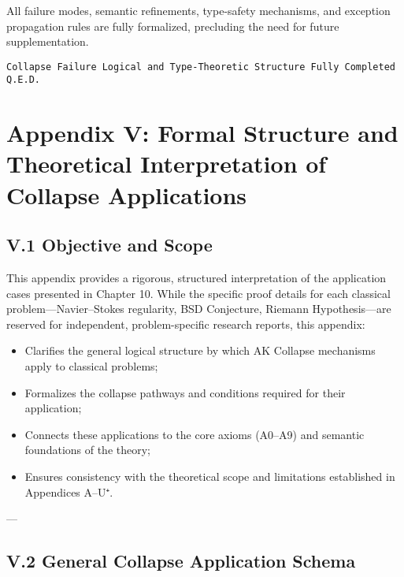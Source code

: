\documentclass[11pt]{article}
\begin{document}
All failure modes, semantic refinements, type-safety mechanisms, and exception propagation rules are fully formalized, precluding the need for future supplementation.

\begin{flushright}
\texttt{Collapse Failure Logical and Type-Theoretic Structure \quad Fully Completed \quad Q.E.D.}
\end{flushright}




\section*{Appendix V: Formal Structure and Theoretical Interpretation of Collapse Applications}

\subsection*{V.1 Objective and Scope}

This appendix provides a rigorous, structured interpretation of the application cases presented in Chapter 10.  
While the specific proof details for each classical problem—Navier–Stokes regularity, BSD Conjecture, Riemann Hypothesis—are reserved for independent, problem-specific research reports, this appendix:

\begin{itemize}
    \item Clarifies the general logical structure by which AK Collapse mechanisms apply to classical problems;
    \item Formalizes the collapse pathways and conditions required for their application;
    \item Connects these applications to the core axioms (A0–A9) and semantic foundations of the theory;
    \item Ensures consistency with the theoretical scope and limitations established in Appendices A–U⁺.
\end{itemize}

---

\subsection*{V.2 General Collapse Application Schema}
\end{document}
